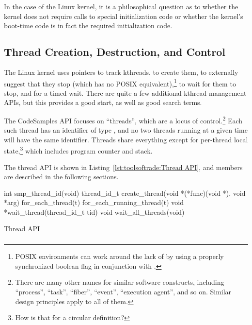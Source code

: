 In the case of the Linux kernel, it is a philosophical question as to
whether the kernel does not require calls to special initialization
code or whether the kernel's boot-time code is in fact the required
initialization code.

\subsection{Thread Creation, Destruction, and Control}
\label{sec:toolsoftrade:Thread Creation, Destruction, and Control}

The Linux kernel uses
 pointers to track kthreads,
 to create them,
 to externally suggest that they stop
(which has no POSIX equivalent),\footnote{
	POSIX environments can work around the lack of
	 by using a properly synchronized
	boolean flag in conjunction with .}
 to wait for them to stop, and
 for a timed wait.
There are quite a few additional kthread-management APIs, but this
provides a good start, as well as good search terms.

The CodeSamples API focuses on ``threads'', which are a locus of
control.\footnote{
	There are many other names for similar software constructs, including
	``process'', ``task'', ``fiber'', ``event'', ``execution agent'',
	and so on.
	Similar design principles apply to all of them.}
Each such thread has an identifier of type ,
and no two threads running at a given time will have the same
identifier.
Threads share everything except for per-thread local state,\footnote{
	How is that for a circular definition?}
which includes program counter and stack.

The thread API is shown in
Listing~\ref{lst:toolsoftrade:Thread API}, and members are described in the
following sections.

\begin{listing}[tbp]
\begin{VerbatimL}[numbers=none,xleftmargin=2pt]
int smp_thread_id(void)
thread_id_t create_thread(void *(*func)(void *), void *arg)
for_each_thread(t)
for_each_running_thread(t)
void *wait_thread(thread_id_t tid)
void wait_all_threads(void)
\end{VerbatimL}
\caption{Thread API}
\label{lst:toolsoftrade:Thread API}
\end{listing}

\subsubsection{}


